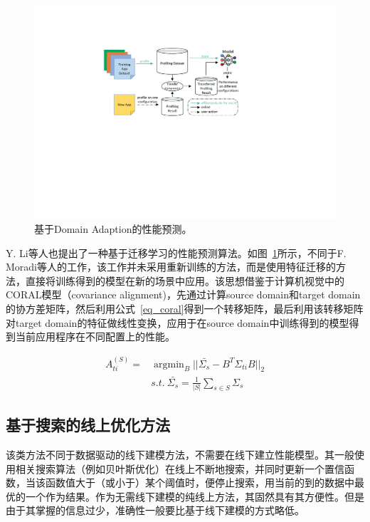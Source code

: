 \begin{figure}[h]
    \centerline{\includegraphics[width=\textwidth]{figures/arch_v2.pdf}}
    \caption{基于Domain Adaption的性能预测。}
    \label{li_jcc_arch}
\end{figure}

Y. Li等人\parencite{li2020cross}也提出了一种基于迁移学习的性能预测算法。如图~\ref{li_jcc_arch}所示，不同于F. Moradi等人的工作，该工作并未采用重新训练的方法，而是使用特征迁移的方法，直接将训练得到的模型在新的场景中应用。该思想借鉴于计算机视觉中的CORAL模型（covariance alignment)\parencite{sun2017correlation}，先通过计算source domain和target domain的协方差矩阵，然后利用公式~\ref{eq_coral}得到一个转移矩阵，最后利用该转移矩阵对target domain的特征做线性变换，应用于在source domain中训练得到的模型得到当前应用程序在不同配置上的性能。

\begin{equation}\label{eq_coral}
	\begin{aligned}
		A_{ti}^{(S)} = &\operatorname{argmin}_B||\bar{\Sigma_s} - B^T\Sigma_{ti}B||_2 \\
		&s.t.\ \bar{\Sigma_s} = \frac{1}{|S|}\sum_{s \in S}\Sigma_s
	\end{aligned}
\end{equation}

\subsection{基于搜索的线上优化方法}
该类方法不同于数据驱动的线下建模方法，不需要在线下建立性能模型。其一般使用相关搜索算法（例如贝叶斯优化）在线上不断地搜索，并同时更新一个置信函数，当该函数值大于（或小于）某个阈值时，便停止搜索，用当前的到的数据中最优的一个作为结果。作为无需线下建模的纯线上方法，其固然具有其方便性。但是由于其掌握的信息过少，准确性一般要比基于线下建模的方式略低。

